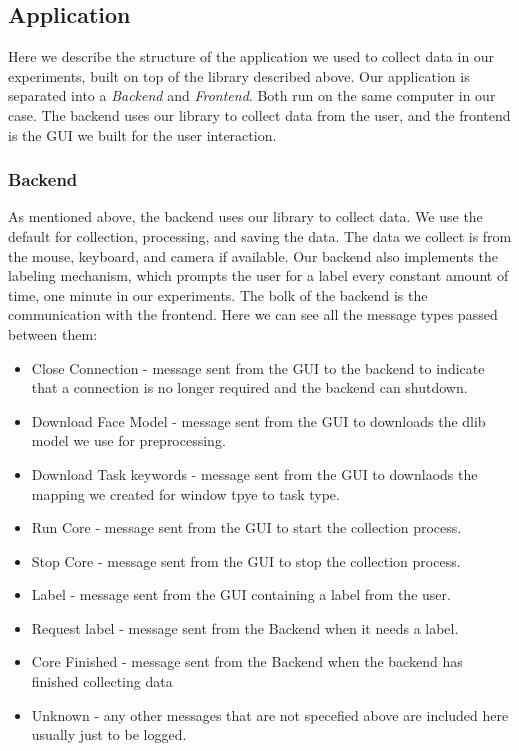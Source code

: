 \subsection{Application}


Here we describe the structure of the application we used to collect data in our experiments, built on top of the library described above. 
Our application is separated into a \textit{Backend} and \textit{Frontend}. Both run on the same computer in our case. 
The backend uses our library to collect data from the user, and the frontend is the GUI we built for the user interaction.

\subsubsection{Backend}
As mentioned above, the backend uses our library to collect data. We use the default for collection, processing, and saving the data. 
The data we collect is from the mouse, keyboard, and camera if available. Our backend also implements the labeling mechanism, 
which prompts the user for a label every constant amount of time, one minute in our experiments.
The bolk of the backend is the communication with the frontend. Here we can see all the message types passed between them:

\begin{itemize}
    \item Close Connection - message sent from the GUI to the backend to indicate that a connection is no longer required and the backend can shutdown.
    \item Download Face Model - message sent from the GUI to downloads the dlib model we use for preprocessing.
    \item Download Task keywords - message sent from the GUI to downlaods the mapping we created for window tpye to task type.
    \item Run Core - message sent from the GUI to start the collection process.
    \item Stop Core - message sent from the GUI to stop the collection process.
    \item Label - message sent from the GUI containing a label from the user.
    \item Request label - message sent from the Backend when it needs a label.
    \item Core Finished - message sent from the Backend when the backend has finished collecting data
    \item Unknown - any other messages that are not specefied above are included here usually just to be logged.
\end{itemize}

